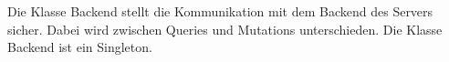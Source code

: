 Die Klasse Backend stellt die Kommunikation mit dem Backend des Servers sicher.
Dabei wird zwischen Queries und Mutations unterschieden.
Die Klasse Backend ist ein Singleton.